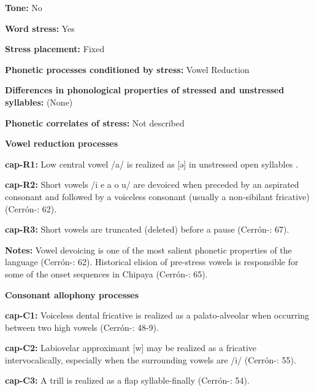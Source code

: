\textbf{Tone:} No



\textbf{Word stress:} Yes



\textbf{Stress placement:} Fixed



\textbf{Phonetic processes conditioned by stress:} Vowel Reduction



\textbf{Differences in phonological properties of stressed and unstressed syllables:} (None)



\textbf{Phonetic correlates of stress:} Not described



\textbf{Vowel reduction processes}



\textbf{cap-R1:} Low central vowel /a/ is realized as [ə] in unstressed open syllables \citep[301]{Olson1967}.



\textbf{cap-R2:} Short vowels /i e a o u/ are devoiced when preceded by an aspirated consonant and followed by a voiceless consonant (usually a non-sibilant fricative) (Cerrón-\citealt{Palomino2006}: 62).



\textbf{cap-R3:} Short vowels are truncated (deleted) before a pause (Cerrón-\citealt{Palomino2006}: 67).



\textbf{Notes:} Vowel devoicing is one of the most salient phonetic properties of the language (Cerrón-\citealt{Palomino2006}: 62). Historical elision of pre-stress vowels is responsible for some of the onset sequences in Chipaya (Cerrón-\citealt{Palomino2006}: 65).



\textbf{Consonant allophony processes}



\textbf{cap-C1:} Voiceless dental fricative is realized as a palato-alveolar when occurring between two high vowels (Cerrón-\citealt{Palomino2006}: 48-9).



\textbf{cap-C2:} Labiovelar approximant [w] may be realized as a fricative intervocalically, especially when the surrounding vowels are /i/ (Cerrón-\citealt{Palomino2006}: 55).



\textbf{cap-C3:} A trill is realized as a flap syllable-finally (Cerrón-\citealt{Palomino2006}: 54).



